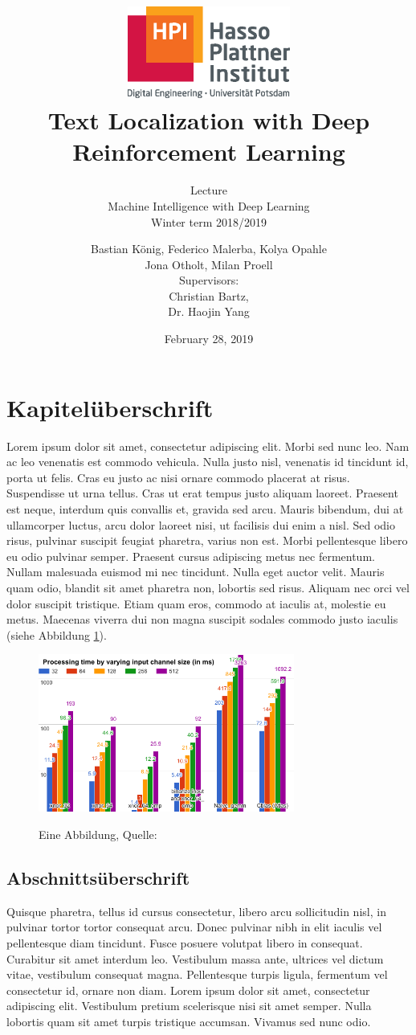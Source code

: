 \documentclass[a4paper,12pt,pagesize,headsepline,bibtotoc,titlepage]{scrartcl}
\title{
	\includegraphics*[width=0.4\textwidth]{hpi_logo_2017.eps}\\
	\vspace{24pt}
	Text Localization with Deep Reinforcement Learning
}
\subtitle{
	Lecture\\
	Machine Intelligence with Deep Learning\\
	Winter term 2018/2019
}
\author{
	Bastian König, Federico Malerba, Kolya Opahle\\
	Jona Otholt, Milan Proell\\[12pt]
	Supervisors:\\
	Christian Bartz,\\	
	Dr. Haojin Yang
}
\date{February 28, 2019}
\begin{document}
\maketitle
\tableofcontents
\newpage


\section{Kapitelüberschrift}
Lorem ipsum dolor sit amet, consectetur adipiscing elit. Morbi sed nunc leo. Nam ac leo venenatis est commodo vehicula. Nulla justo nisl, venenatis id tincidunt id, porta ut felis. Cras eu justo ac nisi ornare commodo placerat at risus. Suspendisse ut urna tellus. Cras ut erat tempus justo aliquam laoreet. Praesent est neque, interdum quis convallis et, gravida sed arcu. Mauris bibendum, dui at ullamcorper luctus, arcu dolor laoreet nisi, ut facilisis dui enim a nisl. Sed odio risus, pulvinar suscipit feugiat pharetra, varius non est. Morbi pellentesque libero eu odio pulvinar semper. Praesent cursus adipiscing metus nec fermentum. Nullam malesuada euismod mi nec tincidunt. Nulla eget auctor velit. Mauris quam odio, blandit sit amet pharetra non, lobortis sed risus. Aliquam nec orci vel dolor suscipit tristique. Etiam quam eros, commodo at iaculis at, molestie eu metus. Maecenas viverra dui non magna suscipit sodales commodo justo iaculis (siehe Abbildung \ref{abb:test}).

\begin{figure}[hbp]
\begin{center}
\includegraphics*[width=0.75\textwidth]{beispiel.png}\\
\caption{Eine Abbildung, Quelle: \cite{BMXNet17}}
\label{abb:test}
\end{center}
\end{figure}

\subsection{Abschnittsüberschrift}
Quisque pharetra, tellus id cursus consectetur, libero arcu sollicitudin nisl, in pulvinar tortor tortor consequat arcu. Donec pulvinar nibh in elit iaculis vel pellentesque diam tincidunt. Fusce posuere volutpat libero in consequat. Curabitur sit amet interdum leo. Vestibulum massa ante, ultrices vel dictum vitae, vestibulum consequat magna. Pellentesque turpis ligula, fermentum vel consectetur id, ornare non diam. Lorem ipsum dolor sit amet, consectetur adipiscing elit. Vestibulum pretium scelerisque nisi sit amet semper. Nulla lobortis quam sit amet turpis tristique accumsan. Vivamus sed nunc odio.
\end{document}
